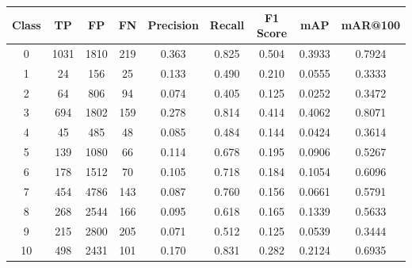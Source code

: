 \documentclass[12pt,oneside]{book} %
\begin{document}
\begin{table}[H]
    \centering
    \begin{tabular}{|c|c|c|c|c|c|c|c|c|}
        \hline
        \textbf{Class} & \textbf{TP} & \textbf{FP} & \textbf{FN} & \textbf{Precision} & \textbf{Recall} & \textbf{F1 Score} & \textbf{mAP} & \textbf{mAR@100} \\ \hline
        0              & 1031        & 1810        & 219         & 0.363              & 0.825           & 0.504             & 0.3933       & 0.7924           \\ \hline
        1              & 24          & 156         & 25          & 0.133              & 0.490           & 0.210             & 0.0555       & 0.3333           \\ \hline
        2              & 64          & 806         & 94          & 0.074              & 0.405           & 0.125             & 0.0252       & 0.3472           \\ \hline
        3              & 694         & 1802        & 159         & 0.278              & 0.814           & 0.414             & 0.4062       & 0.8071           \\ \hline
        4              & 45          & 485         & 48          & 0.085              & 0.484           & 0.144             & 0.0424       & 0.3614           \\ \hline
        5              & 139         & 1080        & 66          & 0.114              & 0.678           & 0.195             & 0.0906       & 0.5267           \\ \hline
        6              & 178         & 1512        & 70          & 0.105              & 0.718           & 0.184             & 0.1054       & 0.6096           \\ \hline
        7              & 454         & 4786        & 143         & 0.087              & 0.760           & 0.156             & 0.0661       & 0.5791           \\ \hline
        8              & 268         & 2544        & 166         & 0.095              & 0.618           & 0.165             & 0.1339       & 0.5633           \\ \hline
        9              & 215         & 2800        & 205         & 0.071              & 0.512           & 0.125             & 0.0539       & 0.3444           \\ \hline
        10             & 498         & 2431        & 101         & 0.170              & 0.831           & 0.282             & 0.2124       & 0.6935           \\ \hline

\end{tabular}
\end{table}
\end{document}
